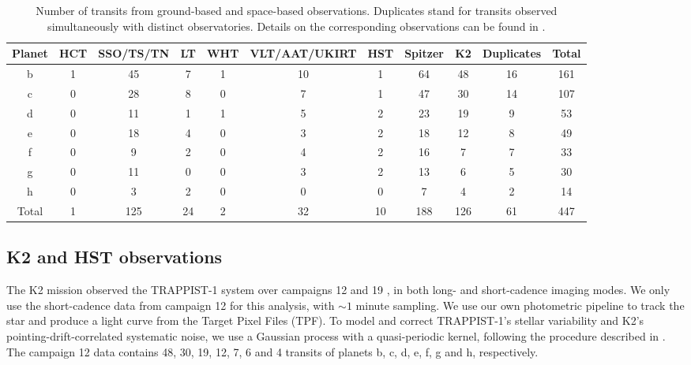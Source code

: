 \documentclass[twocolumn]{aastex63}
\begin{document}
\begin{table}
\centering                          
\begin{tabular}{c c c c c c c c c c c}        
\hline                
Planet  & HCT & SSO/TS/TN & LT & WHT & VLT/AAT/UKIRT & HST & Spitzer & K2 & Duplicates & Total  \\   
\hline                        
   b  & 1 & 45 & 7 & 1 & 10 & 1 & 64 & 48  & 16 & 161  \\      
   c  & 0 & 28 & 8 & 0 &  7 & 1 & 47 & 30  & 14 & 107  \\  
   d  & 0 & 11 & 1 & 1 &  5 & 2 & 23 & 19  & 9 & 53 \\  
   e  & 0 & 18 & 4 & 0 &  3 & 2 & 18 & 12  & 8 & 49 \\  
   f  & 0 &  9 & 2 & 0 &  4 & 2 & 16 &  7 & 7 & 33  \\  
   g  & 0 & 11 & 0 & 0 &  3 & 2 & 13 &  6 & 5 & 30  \\  
   h  & 0 &  3 & 2 & 0 &  0 & 0 & 7 &  4  & 2 & 14  \\
   \hline
Total & 1 & 125 & 24 & 2 &  32 & 10 & 188 & 126 & 61 & 447 \\
\hline 
\end{tabular}
\caption{Number of transits from ground-based and space-based observations. Duplicates stand for transits observed simultaneously with distinct observatories. Details on the corresponding observations can be found in \citet{Gillon2016,Gillon2017,Grimm2018,deWit2016,deWit2018,Delrez2018a,Ducrot2018,Burdanov2019,Ducrot2020}.}         
\label{tab:transit_time_list}
\end{table}

\subsection{K2 and HST observations}


The K2 mission \citep{Howell2014} observed the TRAPPIST-1 system over campaigns 12 and 19 \citep{Luger2017a}, in both long- and short-cadence imaging modes. We only use the short-cadence data from campaign 12 for this analysis, with $\sim1$ minute sampling. We use our own photometric pipeline to track the star and produce a light curve from the Target Pixel Files (TPF). To model and correct TRAPPIST-1's stellar variability and K2's pointing-drift-correlated systematic noise, we use a Gaussian process with a quasi-periodic kernel, following the procedure described in \cite{Grimm2018}. The campaign 12 data contains 48, 30, 19, 12, 7, 6 and 4 transits of planets b, c, d, e, f, g and h, respectively. %
\end{document}
